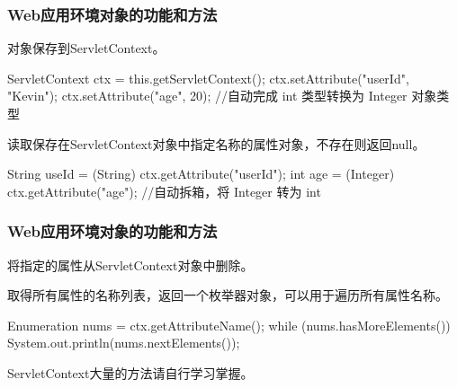 \begin{frame}[fragile] %
  \frametitle{Web应用环境对象的功能和方法} 



  对象保存到ServletContext。

  \begin{javaCode}
    ServletContext ctx = this.getServletContext();
    ctx.setAttribute("userId", "Kevin");
    ctx.setAttribute("age", 20); //自动完成 int 类型转换为 Integer 对象类型
  \end{javaCode}


  读取保存在ServletContext对象中指定名称的属性对象，不存在则返回null。

  \begin{javaCode}
    String useId = (String) ctx.getAttribute("userId");
    int age = (Integer) ctx.getAttribute("age"); //自动拆箱，将 Integer 转为 int
  \end{javaCode}
\end{frame}

\begin{frame}[fragile] %
  \frametitle{Web应用环境对象的功能和方法} 


  将指定的属性从ServletContext对象中删除。


  取得所有属性的名称列表，返回一个枚举器对象，可以用于遍历所有属性名称。
  \begin{javaCode}
    Enumeration nums = ctx.getAttributeName();
    while (nums.hasMoreElements()) {
      System.out.println(nums.nextElements());
    }
  \end{javaCode}

   ServletContext大量的方法请自行学习掌握。
\end{frame}

